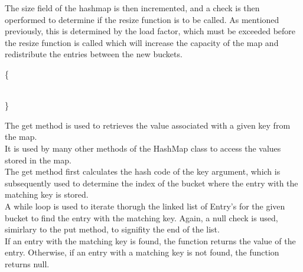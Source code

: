 \documentclass[a4paper]{article}
\begin{document}
The size field of the hashmap is then incremented, 
and a check is then operformed to determine if the resize function is to be called.
As mentioned previously, this is determined by the load factor, 
which must be exceeded before the resize function is called
which will increase the capacity of the map and redistribute the entries 
between the new buckets.

\pagebreak





\vspace{4mm}
\makeatletter
\renewcommand{\ALG@name}{Hashmap Method}
\makeatother

\begin{algorithm}
\caption{}\label{euclid}
\begin{algorithmic}[1]

\algrenewcommand{}
 {\{}
\State{}
\State\quad{}
\State\quad{\tt \} }
\State{}
\State{\tt \} }


\\
{\}}
\EndProcedure
\end{algorithmic}
\end{algorithm}

The get method is used to retrieves the value associated with a given key from the map. \\

It is used by many other methods of the HashMap class to access the values stored in the map. \\

The get method first calculates the hash code of the key argument,
which is subsequently used to determine the index of the bucket where the entry with the matching key is stored. \\

A while loop is used to iterate thorugh the linked list of Entry's for the given bucket to find the entry with the matching key. 
Again, a null check is used, simirlary to the put method, to signifity the end of the list. \\

If an entry with the matching key is found, the function returns the value of the entry. 
Otherwise, if an entry with a matching key is not found, the function returns null.
\end{document}
